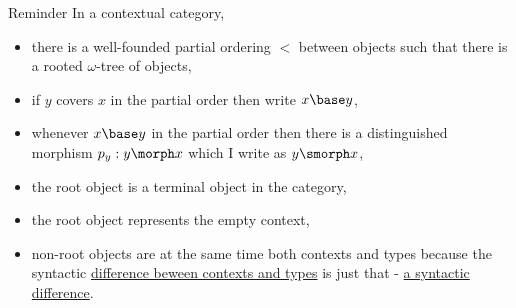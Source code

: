

\begin{frame}{Reminder}
In a contextual category,
\begin{itemize}
\item there is a well-founded partial ordering $<$ between objects
such that there is  a rooted $\omega$-tree of objects,
\item if $y$ covers $x$ in the partial order then write $x \base y$,
\item whenever $x \base y$ in the partial order then there is a distinguished
morphism $p_y:y \morph x$ which I write as $y \smorph x$,
\item the root object is a terminal object in the category,
\item the root object represents the empty context, 
\item non-root objects are at the same time both contexts and types
because the syntactic \underline{difference beween contexts and types} is 
just that - \underline{a syntactic difference}. 
\end{itemize}
\end{frame}

